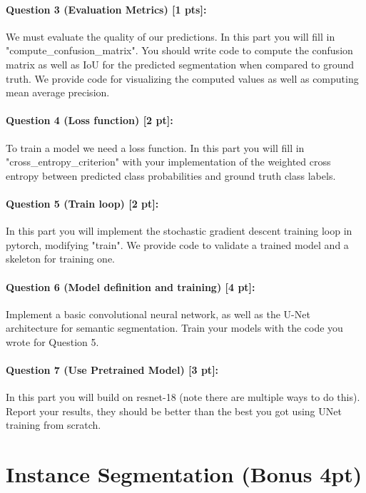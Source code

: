 \documentclass[11pt]{article}
\begin{document}
\paragraph{Question 3 (Evaluation Metrics) [1 pts]:}  
We must evaluate the quality of our predictions. In this part you will fill in "compute\_confusion\_matrix". You should write code to compute the confusion matrix as well as IoU for the predicted segmentation when compared to ground truth. We provide code for visualizing the computed values as well as computing mean average precision.

\paragraph{Question 4 (Loss function) [2 pt]:} 
To train a model we need a loss function. In this part you will fill in "cross\_entropy\_criterion" with your implementation of the weighted cross entropy between predicted class probabilities and ground truth class labels.

\paragraph{Question 5 (Train loop) [2 pt]:} 
In this part you will implement the stochastic gradient descent training loop in pytorch, modifying "train". We provide code to validate a trained model and a skeleton for training one. 

\paragraph{Question 6 (Model definition and training) [4 pt]:} 
Implement a basic convolutional neural network, as well as the U-Net architecture for semantic segmentation. Train your models with the code you wrote for Question 5. 

\paragraph{Question 7 (Use Pretrained Model) [3 pt]:} 
In this part you will build on resnet-18 (note there are multiple ways to do this). Report your results, they should be better than the best you got using UNet training from scratch.

\section*{Instance Segmentation (Bonus 4pt)}
\end{document}
